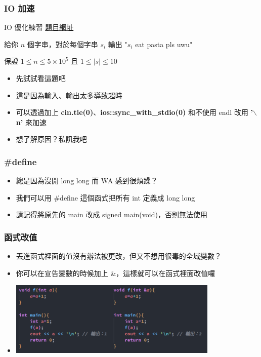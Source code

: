 \documentclass{beamer}
\begin{document}
\begin{frame}
    \frametitle{IO 加速}
    \begin{block}{IO 優化練習}
        \href{https://codeforces.com/group/S6XjkGb6qB/contest/403070/problem/A}{題目網址}

        給你 $n$ 個字串，對於每個字串 $s_i$ 輸出 "$s_i$ eat pasta pls uwu"

        保證 $1 \leq n \leq 5 \times 10^5$ 且 $1 \leq \mid s \mid \leq 10$
    \end{block}
    \begin{itemize}
        \item {先試試看這題吧}
        \item<2-> 這是因為輸入、輸出太多導致超時
        \item<2-> 可以透過加上 \textbf{cin.tie(0)}、\textbf{ios::sync\_with\_stdio(0)} 和不使用 endl 改用 \textbf{'$\backslash$ n'} 來加速
        \item<3-> 想了解原因？私訊我吧
    \end{itemize}
\end{frame}

\begin{frame}
    \frametitle{\#define}
    \begin{itemize}
        \item 總是因為沒開 long long 而 WA 感到很煩躁？
        \item<2-> 我們可以用 \#define 這個函式把所有 int 定義成 long long
        \item<3-> 請記得將原先的 main 改成 signed main(void)，否則無法使用
    \end{itemize}
\end{frame}

\begin{frame}
    \frametitle{函式改值}
    \begin{itemize}
        \item 丟進函式裡面的值沒有辦法被更改，但又不想用很毒的全域變數？
        \item 你可以在宣告變數的時候加上 \&，這樣就可以在函式裡面改值囉
        \vspace{0.5cm}
        \item \includegraphics[width=10.0cm]{img/code_3.png}
    \end{itemize}
\end{frame}
\end{document}
